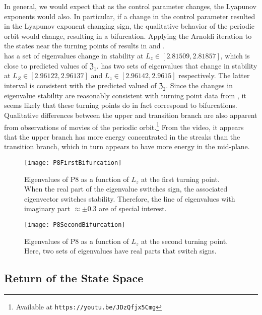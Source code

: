 In general, we would expect that as the control parameter changes, the Lyapunov exponents would also. In particular, if a change in the control parameter resulted in the Lyapunov exponent changing sign, the qualitative behavior of the periodic orbit would change, resulting in a bifurcation. Applying the Arnoldi iteration to the states near the turning points of  results in  and . \\
\clearpage
  has a set of eigenvalues change in stability at $L_z \in [2.81509, 2.81857]$, which is close to predicted values of $\mathfrak{Z}_1$.  has two sets of eigenvalues that change in stability at $L_Z \in  [2.96122,2.96137]$ and $L_z \in [ 2.96142,2.9615]$ respectively. The latter interval is consistent with the predicted valued of $\mathfrak{Z}_2$. Since the changes in eigenvalue stability are reasonably consistent with turning point data from , it seems likely that these turning points do in fact correspond to bifurcations. Qualitative differences between the upper and transition branch are also apparent from observations of movies of the periodic orbit.\footnote{Available at {\tt https://youtu.be/JDzQfjx5Cmg}} From the video, it appears that the upper branch has more energy concentrated in the streaks than the transition branch, which in turn appears to have more energy in the mid-plane. \\

\begin{figure}[t]
\texttt{[image: P8FirstBifurcation]}
\caption{Eigenvalues of P8 as a function of $L_z$ at the first turning point. When the real part of the eigenvalue switches sign, the associated eigenvector switches stability. Therefore, the line of eigenvalues with imaginary part  $\approx \pm 0.3$ are of special interest.}\label{fig:P8FirstBifurcation}
\end{figure}


\begin{figure}[h]
\texttt{[image: P8SecondBifurcation]}
\caption{Eigenvalues of P8 as a function of $L_z$ at the second turning point. Here, two sets of eigenvalues have real parts that switch signs. }\label{fig:P8SecondBifurcation}
\end{figure}

\subsection{Return of the State Space}

